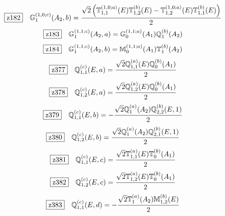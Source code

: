\documentclass[fleqn,10pt,landscape]{jsarticle}
\begin{document}
\begin{dmath*}
\hspace*{3mm}\fbox{z182}\quad \mathbb{G}_{1}^{(1,0;c)}(A_{2},b)=\frac{\sqrt{2} \left(\mathbb{T}_{1,1}^{(1,0;a)}(E) \mathbb{T}_{1,2}^{(b)}(E) - \mathbb{T}_{1,2}^{(1,0;a)}(E) \mathbb{T}_{1,1}^{(b)}(E)\right)}{2}
\end{dmath*}
\begin{dmath*}
\hspace*{3mm}\fbox{z183}\quad \mathbb{G}_{1}^{(1,1;c)}(A_{2},a)=\mathbb{G}_{0}^{(1,1;a)}(A_{1}) \mathbb{Q}_{1}^{(b)}(A_{2})
\end{dmath*}
\begin{dmath*}
\hspace*{3mm}\fbox{z184}\quad \mathbb{G}_{1}^{(1,1;c)}(A_{2},b)=\mathbb{M}_{0}^{(1,1;a)}(A_{1}) \mathbb{T}_{1}^{(b)}(A_{2})
\end{dmath*}
\begin{dmath*}
\hspace*{3mm}\fbox{z377}\quad \mathbb{Q}_{1,1}^{(c)}(E,a)=\frac{\sqrt{2} \mathbb{Q}_{1,1}^{(a)}(E) \mathbb{Q}_{0}^{(b)}(A_{1})}{2}
\end{dmath*}
\begin{dmath*}
\hspace*{3mm}\fbox{z378}\quad \mathbb{Q}_{1,2}^{(c)}(E,a)=\frac{\sqrt{2} \mathbb{Q}_{1,2}^{(a)}(E) \mathbb{Q}_{0}^{(b)}(A_{1})}{2}
\end{dmath*}
\begin{dmath*}
\hspace*{3mm}\fbox{z379}\quad \mathbb{Q}_{1,1}^{(c)}(E,b)=- \frac{\sqrt{2} \mathbb{Q}_{1}^{(a)}(A_{2}) \mathbb{Q}_{2,2}^{(b)}(E,1)}{2}
\end{dmath*}
\begin{dmath*}
\hspace*{3mm}\fbox{z380}\quad \mathbb{Q}_{1,2}^{(c)}(E,b)=\frac{\sqrt{2} \mathbb{Q}_{1}^{(a)}(A_{2}) \mathbb{Q}_{2,1}^{(b)}(E,1)}{2}
\end{dmath*}
\begin{dmath*}
\hspace*{3mm}\fbox{z381}\quad \mathbb{Q}_{1,1}^{(c)}(E,c)=\frac{\sqrt{2} \mathbb{T}_{1,1}^{(a)}(E) \mathbb{T}_{0}^{(b)}(A_{1})}{2}
\end{dmath*}
\begin{dmath*}
\hspace*{3mm}\fbox{z382}\quad \mathbb{Q}_{1,2}^{(c)}(E,c)=\frac{\sqrt{2} \mathbb{T}_{1,2}^{(a)}(E) \mathbb{T}_{0}^{(b)}(A_{1})}{2}
\end{dmath*}
\begin{dmath*}
\hspace*{3mm}\fbox{z383}\quad \mathbb{Q}_{1,1}^{(c)}(E,d)=- \frac{\sqrt{2} \mathbb{T}_{1}^{(a)}(A_{2}) \mathbb{M}_{1,2}^{(b)}(E)}{2}
\end{dmath*}
\end{document}
